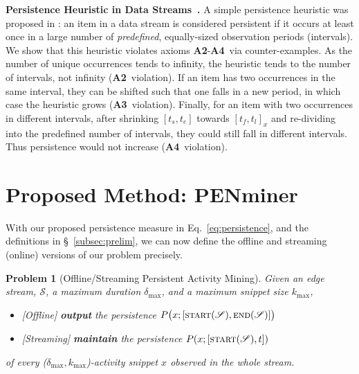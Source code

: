 \documentclass[sigconf]{acmart}
\newtheorem{problem}{Problem}
\newcommand{\method}{PENminer\xspace}
\newcommand{\timestamp}{t}
\newcommand{\stream}{\mathscr{S}}
\newcommand{\streamStart}{\textsc{start}(\stream)}
\newcommand{\streamEnd}{\textsc{end}(\stream)}
\newcommand{\pattern}{x}
\newcommand{\patternSize}{k}
\newcommand{\duration}{\delta}
\newcommand{\maxDuration}{\duration_{\max}}
\newcommand{\maxSize}{\patternSize_{\max}}
\newcommand{\x}{x}
\newcommand{\intervalStart}{t_s}
\newcommand{\intervalEnd}{t_e}
\newcommand{\interval}{[\intervalStart, \intervalEnd]}
\newcommand{\firstOcc}{t_f}
\newcommand{\lastOcc}{t_l}
\newcommand{\occInterval}{[\firstOcc,\lastOcc]}
\newcommand{\persistence}{P}
\newcommand{\axiomTwo}{\textbf{A2}}
\newcommand{\axiomThree}{\textbf{A3}}
\newcommand{\axiomFour}{\textbf{A4}}
\begin{document}
\noindent \textbf{Persistence Heuristic in Data Streams~\cite{dai2016finding}.} 
A simple persistence heuristic was proposed in \cite{dai2016finding}: an item in a data stream is considered persistent if it occurs at least once in a large number of \textit{predefined}, equally-sized observation periods (intervals).
We show that this heuristic violates axioms \axiomTwo-\axiomFour\ via counter-examples. As the number of unique occurrences tends to infinity, the heuristic tends to the number of intervals,
not infinity (\axiomTwo\ violation). If an item has two occurrences in the same interval, they can be shifted such that one falls in a new period, in which case the heuristic 
grows (\axiomThree\ violation). 
Finally, for an item with two occurrences in different intervals, after 
shrinking $\interval$ towards $\occInterval_\x$ and re-dividing into the predefined number of intervals, they could still fall in different intervals. 
Thus persistence would not increase (\axiomFour\ violation).











\section{Proposed Method: \method}
\label{sec:method}




With our proposed persistence measure in Eq.~\eqref{eq:persistence}, and the definitions in \S~\ref{subsec:prelim}, we can now define the offline and streaming (online) versions of our problem precisely. 

\begin{problem}[Offline/Streaming Persistent Activity Mining]\label{problem:prob-formal}
Given an edge stream, $\stream$, a maximum duration $\maxDuration$, and a maximum snippet size $\maxSize$, 
\begin{itemize}
    \item {\emph{[}Offline\emph{]}} \textbf{output} the persistence $\persistence\big(\pattern;[\streamStart,\streamEnd]\big)$
    \item {\emph{[}Streaming\emph{]}} \textbf{maintain} the persistence $\persistence(\pattern;[\streamStart,\timestamp])$
\end{itemize}
 of every \emph{(}$\maxDuration, \maxSize$\emph{)}-activity snippet $\pattern$ observed in the whole stream. 
\end{problem}
\end{document}
